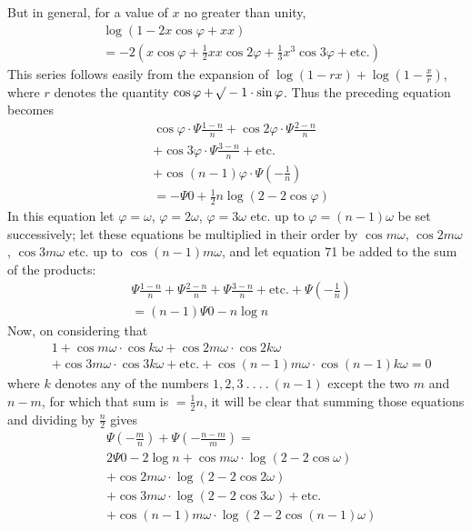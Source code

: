 But in general, for a value of $x$ no greater than unity,
\[
\begin{aligned}
&\log(1-2x\cos\varphi+xx)\\[4pt]
&=-2(x\cos\varphi+\tfrac12xx\cos2\varphi+\tfrac13x^3\cos3\varphi+\text{etc.})
\end{aligned}
\]
This series follows easily from the expansion of $\log(1-rx)+\log\left(1-\frac xr\right)$, where $r$ denotes the quantity $\cos\varphi+\mathord{{}^{}\!\surd}-1\cdot\sin\varphi$. Thus the preceding equation becomes
\[
\begin{aligned}
&\cos\varphi\cdot\Psi\frac{1-n}{n}+\cos2\varphi\cdot\Psi\frac{2-n}{n}\\[4pt]
&+\cos3\varphi\cdot\Psi\frac{3-n}{n}+\text{etc.}\\[4pt]
&+\cos(n-1)\varphi\cdot\Psi\left(-\frac1n\right)
\\[4pt]
&=-\Psi0+\tfrac12n\log(2-2\cos\varphi)
\end{aligned}
\tag*{[72]}\]
In this equation let $\varphi=\omega$, $\varphi=2\omega$, $\varphi=3\omega$ etc. up to $\varphi=(n-1)\omega$ be set successively; let these equations be multiplied in their order by $\cos m\omega$, $\cos2m\omega$, $\cos3m\omega$ etc. up to $\cos(n-1)m\omega$, and let equation 71 be added to the sum of the products:
\[
\begin{aligned}
&\Psi\frac{1-n}{n}+\Psi\frac{2-n}{n}+\Psi\frac{3-n}{n}+\text{etc.}+\Psi\left(-\frac1n\right)\\[4pt]
&=(n-1)\Psi0-n\log n
\end{aligned}
\]
Now, on considering that
\[
\begin{aligned}
&1+\cos m\omega\cdot\cos k\omega+\cos2m\omega\cdot\cos2k\omega\\[4pt]
&+\cos3m\omega\cdot\cos3k\omega
+\text{etc.}+\cos(n-1)m\omega\cdot\cos(n-1)k\omega=0
\end{aligned}
\]
where $k$ denotes any of the numbers $1,2,3\ .\ .\ .\ .\ (n-1)$ except the two $m$ and $n-m$, for which that sum is $=\tfrac12n$, it will be clear that summing those equations and dividing by $\frac n2$ gives
\[
\begin{aligned}
&\Psi\left(-\frac mn\right)+\Psi\left(-\frac{n-m}{m}\right)=
\\[4pt]
&2\Psi0-2\log n+\cos m\omega\cdot\log(2-2\cos\omega)\\[4pt]
&+\cos2m\omega\cdot\log(2-2\cos2\omega)
\\[4pt]
&+\cos3m\omega\cdot\log(2-2\cos3\omega)+\text{etc.}\\[4pt]
&+\cos(n-1)m\omega\cdot\log(2-2\cos(n-1)\omega)
\end{aligned}
\tag*{[73]}\]
